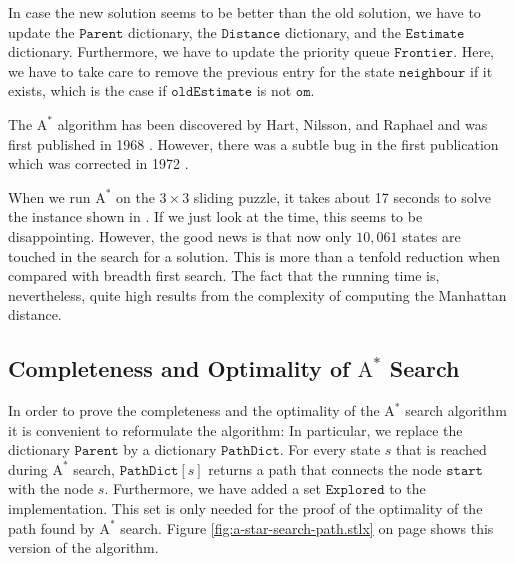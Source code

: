 \begin{enumerate}
\begin{enumerate}
            In case the new solution seems to be better than the old solution, we have to update
            the $\mathtt{Parent}$ dictionary, the $\mathtt{Distance}$ dictionary, and the $\mathtt{Estimate}$
            dictionary.  Furthermore, we have to update the priority queue $\mathtt{Frontier}$.
            Here, we have to take care to remove the previous entry for the state
            $\mathtt{neighbour}$ if it exists, which is the case if $\mathtt{oldEstimate}$ is not $\mathtt{om}$.
      \end{enumerate}
\end{enumerate}
The $\mathrm{A}^*$ algorithm has been discovered by Hart, Nilsson, and Raphael and was first published in
1968 \cite{hart:1968}.  However, there was a subtle bug in the first publication which was corrected
in 1972 \cite{hart:1972}.

When we run $\mathrm{A}^*$ on the $3 \times 3$ sliding puzzle, it takes about 17 seconds to solve the instance
shown in .  If we just look at the time, this seems to be disappointing.  However, the good
news is that now only $10,061$ states are touched in the search for a solution.  This is more than a tenfold
reduction when compared with breadth first search.  The fact that the running time
is, nevertheless, quite high results from the complexity of computing the Manhattan distance.


\subsection{Completeness and Optimality of $\textrm{A}^*$ Search}
In order to prove the completeness and the optimality of the $\textrm{A}^*$ search algorithm it is convenient to
reformulate the algorithm:  In particular, we replace the dictionary $\texttt{Parent}$ by a dictionary
$\texttt{PathDict}$. For every state $s$ that is reached during $\textrm{A}^*$ search, $\texttt{PathDict}[s]$ returns a
path that connects the node $\texttt{start}$ with the node $s$.  Furthermore, we have added a set
$\texttt{Explored}$ to the implementation.  This set is only needed for the proof of the optimality of
the path found by $\mathrm{A}^*$ search.  Figure \ref{fig:a-star-search-path.stlx} on page
\pageref{fig:a-star-search-path.stlx} shows this version of the algorithm.



